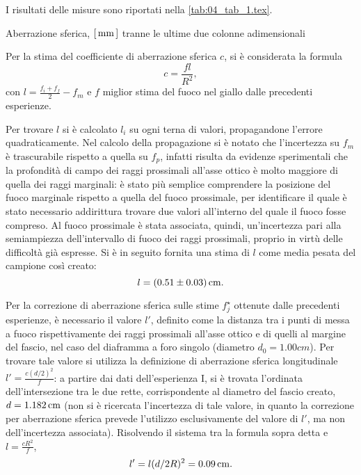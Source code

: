 
I risultati delle misure sono riportati nella \autoref{tab:04_tab_1.tex}.
\begin{tabella}
	\centering
	
	\caption{Aberrazione sferica, $[\,\mathrm{mm}\,]$ tranne le ultime due colonne adimensionali}
	\label{tab:04_tab_1.tex}
\end{tabella}

Per la stima del coefficiente di aberrazione sferica $c$, si \`e considerata la formula
\[ c=\frac{f   l}{R^2}, \] 
con \( l = \frac{f_i + f_f}{2} - f_m \) e $f$ miglior stima del fuoco nel giallo dalle precedenti esperienze.


Per trovare $l$ si \`e calcolato $l_i$ su ogni terna di valori, propagandone l'errore quadraticamente. Nel calcolo della propagazione si \`e notato che l'incertezza su $f_m$ è trascurabile rispetto a quella su $f_p$, infatti risulta da evidenze sperimentali che la profondità di campo dei raggi prossimali all'asse ottico \`e molto maggiore di quella dei raggi marginali: è stato più semplice comprendere la posizione del fuoco marginale rispetto a quella del fuoco prossimale, per identificare il quale è stato necessario addirittura trovare due valori all'interno del quale il fuoco fosse compreso. Al fuoco prossimale è stata associata, quindi, un'incertezza pari alla semiampiezza dell'intervallo di fuoco dei raggi prossimali, proprio in virt\`u delle difficolt\`a già espresse. Si \`e in seguito fornita una stima di $l$ come media pesata del campione cos\`i creato:
\[ l = (0.51 \pm 0.03) \,\mathrm{cm}. \]


Per la correzione di aberrazione sferica sulle stime $f^{\star}_j$ ottenute dalle precedenti esperienze, \`e necessario il valore $ l'$, definito come la distanza tra i punti di messa a fuoco rispettivamente dei raggi prossimali all'asse ottico e di quelli al margine del fascio, nel caso del diaframma a foro singolo (diametro $d_0=1.00 cm$). Per trovare tale valore si utilizza la definizione di aberrazione sferica longitudinale $l'=\frac{c(d/2)^2}{f}$: a partire dai dati dell'esperienza I, si \`e trovata l'ordinata dell'intersezione tra le due rette, corrispondente al diametro del fascio creato, $d= 1.182 \,\mathrm{cm}$ (non si \`e ricercata l'incertezza di tale valore, in quanto la correzione per aberrazione sferica prevede l'utilizzo esclusivamente del valore di $l'$, ma non dell'incertezza associata). Risolvendo il sistema tra la formula sopra detta e $l=\frac{cR^2}{f}$, 
\[l' = l(d/2R)^2 = 0.09\,\mathrm{cm} .\]


